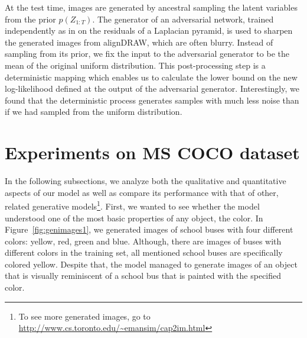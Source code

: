 \documentclass{article} %
\newcommand{\comm}[1]{}
\newcommand{\Lat}{Z}
\newcommand{\prior}{p}
\begin{document}
At the test time, images are generated by ancestral sampling the latent variables from the prior $\prior(\Lat_{1:T})$. 
The generator of an adversarial network, trained independently as in \cite{denton_lapgan} on the residuals of a Laplacian pyramid, is used to sharpen the generated images from alignDRAW, which are often blurry. 
Instead of sampling from its prior, we fix the input to the adversarial generator to be the mean of the original uniform distribution. This post-processing step is a deterministic mapping which enables us to calculate the lower bound on the new log-likelihood defined at the output of the adversarial generator. Interestingly, we found that the deterministic process generates samples with much less noise than if we had sampled from the uniform distribution.

\comm{. The reconstruction loss becomes the loss between sharpened image and correct image, whereas the latent loss stays the same. We also noticed that inputting the mean of the uniform distribution into the edge generator network allowed us to generate samples with much less noise than if we had sampled from the uniform distribution.  }

\vspace{-0.2cm}
\section{Experiments on MS COCO dataset}

In the following subsections, we analyze both the qualitative and quantitative aspects of our model as well as compare its performance with that of other, related generative models\footnote{To see more generated images, go to \url{http://www.cs.toronto.edu/~emansim/cap2im.html}}.
First, we wanted to see whether the model understood one of the most basic properties of any object, the color. In Figure~\ref{fig:genimages1}, we generated images of school buses with four different colors: yellow, red, green and blue. Although, there are images of buses with different colors in the training set, all mentioned school buses are specifically colored yellow. Despite that, the model managed to generate images of an object that is visually reminiscent of a school bus that is painted with the specified color.
\end{document}

